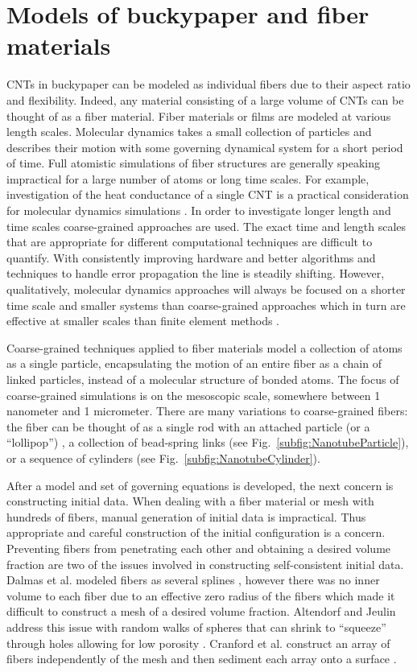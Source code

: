 \section{Models of buckypaper and fiber materials}

	CNTs in buckypaper can be modeled as individual fibers due to their aspect ratio and flexibility. Indeed, any material consisting of a large volume of CNTs can be thought of as a fiber material. Fiber materials or films are modeled at various length scales. Molecular dynamics takes a small collection of particles and describes their motion with some governing dynamical system for a short period of time. Full atomistic simulations of fiber structures are generally speaking impractical for a large number of atoms or long time scales. For example, investigation of the heat conductance of a single CNT is a practical consideration for molecular dynamics simulations \cite{Maruyama2003}. In order to investigate longer length and time scales coarse-grained approaches are used. The exact time and length scales that are appropriate for different computational techniques are difficult to quantify. With consistently improving hardware and better algorithms and techniques to handle error propagation the line is steadily shifting. However, qualitatively, molecular dynamics approaches will always be focused on a shorter time scale and smaller systems than coarse-grained approaches which in turn are effective at smaller scales than finite element methods \cite{Muller2002}.
	
	Coarse-grained techniques applied to fiber materials model a collection of atoms as a single particle, encapsulating the motion of an entire fiber as a chain of linked particles, instead of a molecular structure of bonded atoms. The focus of coarse-grained simulations is on the mesoscopic scale, somewhere between 1 nanometer and 1 micrometer.  There are many variations to coarse-grained fibers: the fiber can be thought of as a single rod with an attached particle (or a ``lollipop'') \cite{Buehler2006}, a collection of bead-spring links \cite{Li2012} (see Fig.~\ref{subfig:NanotubeParticle}), or a sequence of cylinders \cite{Volkov2008} (see Fig.~\ref{subfig:NanotubeCylinder}).
	
After a model and set of governing equations is developed, the next concern is constructing initial data.
When dealing with a fiber material or mesh with hundreds of fibers, manual generation of initial data is impractical.
Thus appropriate and careful construction of the initial configuration is a concern.
Preventing fibers from penetrating each other and obtaining a desired volume fraction are two of the issues involved in constructing self-consistent initial data.
Dalmas et al. modeled fibers as several splines \cite{Dalmas2006}, however there was no inner volume to each fiber due to an effective zero radius of the fibers which made it difficult to construct a mesh of a desired volume fraction.
Altendorf and Jeulin address this issue with random walks of spheres that can shrink to ``squeeze'' through holes allowing for low porosity \cite{Altendorf2011}.
Cranford et al. construct an array of fibers independently of the mesh and then sediment each array onto a surface \cite{Cranford2010}.

